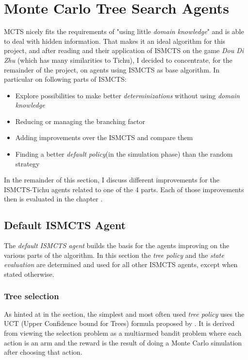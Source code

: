 \section{Monte Carlo Tree Search Agents}
MCTS nicely fits the requirements of "using little \textit{domain knowledge}" and is able to deal with hidden information. That makes it an ideal algorithm for this project, and after reading \cite{surveymcts, ismcts, whitehouse14} and their application of ISMCTS on the game \textit{Dou Di Zhu} (which has many similarities to Tichu), I decided to concentrate, for the remainder of the project, on agents using ISMCTS as base algorithm.
In particular on following parts of ISMCTS:
\begin{itemize}
    \vspace{-10px}
    \item Explore possibilities to make better \textit{determinizations} without using \textit{domain knowledge}
    \item Reducing or managing the branching factor
    \item Adding improvements over the ISMCTS and compare them
    \item Finding a better \textit{default policy}(in the simulation phase) than the random strategy
\end{itemize}

In the remainder of this section, I discuss different improvements for the ISMCTS-Tichu agents related to one of the 4 parts. Each of those improvements then is evaluated in the chapter .

\subsection{Default ISMCTS Agent}
The \textit{default ISMCTS agent} builds the basis for the agents improving on the various parts of the algorithm. In this section the \textit{tree policy} and the \textit{state evaluation} are determined and used for all other ISMCTS agents, except when stated otherwise.

\subsubsection{Tree selection}
\label{sec:uct}
As hinted at in the \textit{} section, the simplest and most often used \textit{tree policy} uses the UCT (Upper Confidence bound for Trees) formula proposed by \cite{uct}.
It is derived from viewing the selection problem as a multiarmed bandit problem where each action is an arm and the reward is the result of doing a Monte Carlo simulation after choosing that action.

